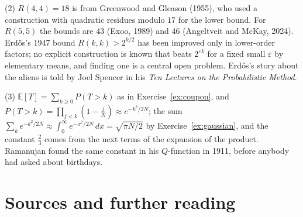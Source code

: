(2) $R(4,4)=18$ is from Greenwood and Gleason (1955), who used a construction with quadratic residues modulo $17$ for the lower bound. For $R(5,5)$ the bounds are $43$ (Exoo, 1989) and $46$ (Angeltveit and McKay, 2024). Erd\H os's 1947 bound $R(k,k)>2^{k/2}$ has been improved only in lower-order factors; no explicit construction is known that beats $2^{\varepsilon k}$ for a fixed small $\varepsilon$ by elementary means, and finding one is a central open problem. Erd\H os's story about the aliens is told by Joel Spencer in his \emph{Ten Lectures on the Probabilistic Method}.

(3) $\mathbb E[T]=\sum_{k\ge0}P(T>k)$ as in Exercise~\ref{ex:coupon}, and $P(T>k)=\prod_{j<k}(1-\frac jN)\approx e^{-k^2/2N}$; the sum $\sum_ke^{-k^2/2N}\approx\int_0^\infty e^{-x^2/2N}\,dx=\sqrt{\pi N/2}$ by Exercise~\ref{ex:gaussian}, and the constant $\frac23$ comes from the next terms of the expansion of the product. Ramanujan found the same constant in his $Q$-function in 1911, before anybody had asked about birthdays.

\section*{Sources and further reading}

